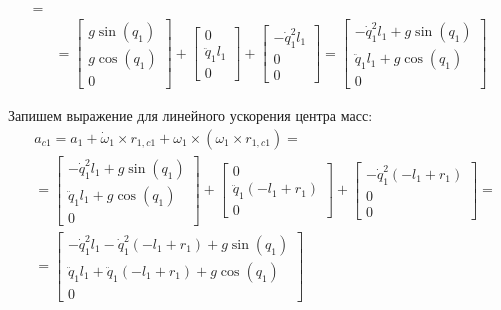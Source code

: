 \documentclass[a4paper,14pt]{extreport}
\begin{document}
\begin{itemize}
\begin{align*}
=\\
&=
\left[\begin{matrix}g \sin{\left (q_{1} \right )}\\g \cos{\left (q_{1} \right )}\\0\end{matrix}\right]
+
\left[\begin{matrix}0\\\ddot{q}_1 l_{1}\\0\end{matrix}\right]
+
\left[\begin{matrix}- \dot{q}_1^{2} l_{1}\\0\\0\end{matrix}\right]
=
\left[\begin{matrix}- \dot{q}_1^{2} l_{1} + g \sin{\left (q_{1} \right )}\\\ddot{q}_1 l_{1} + g \cos{\left (q_{1} \right )}\\0\end{matrix}\right]
\end{align*}

Запишем выражение для линейного ускорения центра масс:
\begin{align*}
&a_{c1} = a_1 + \dot \omega_1 \times r_{1,c1} + \omega_1 \times (\omega_1 \times r_{1,c1})
=\\
&=
\left[\begin{matrix}- \dot{q}_1^{2} l_{1} + g \sin{\left (q_{1} \right )}\\\ddot{q}_1 l_{1} + g \cos{\left (q_{1} \right )}\\0\end{matrix}\right]
+
\left[\begin{matrix}0\\\ddot{q}_1 \left(- l_{1} + r_{1}\right)\\0\end{matrix}\right]
+
\left[\begin{matrix}- \dot{q}_1^{2} \left(- l_{1} + r_{1}\right)\\0\\0\end{matrix}\right]
=\\
&=
\left[\begin{matrix}- \dot{q}_1^{2} l_{1} - \dot{q}_1^{2} \left(- l_{1} + r_{1}\right) + g \sin{\left (q_{1} \right )}\\\ddot{q}_1 l_{1} + \ddot{q}_1 \left(- l_{1} + r_{1}\right) + g \cos{\left (q_{1} \right )}\\0\end{matrix}\right]
\end{align*}


\end{itemize}
\end{document}
